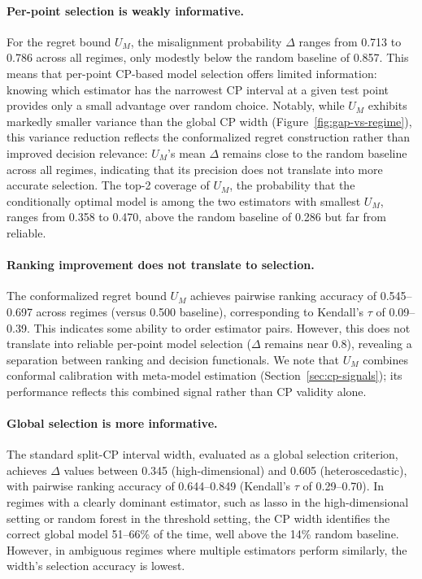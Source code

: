 \documentclass[a4paper,11pt]{article}
\begin{document}
\paragraph{Per-point selection is weakly informative.} For the regret bound $U_M$, the misalignment probability $\Delta$ ranges from 0.713 to 0.786 across all regimes, only modestly below the random baseline of 0.857. This means that per-point CP-based model selection offers limited information: knowing which estimator has the narrowest CP interval at a given test point provides only a small advantage over random choice. Notably, while $U_M$ exhibits markedly smaller variance than the global CP width (Figure~\ref{fig:gap-vs-regime}), this variance reduction reflects the conformalized regret construction rather than improved decision relevance: $U_M$'s mean $\Delta$ remains close to the random baseline across all regimes, indicating that its precision does not translate into more accurate selection. The top-2 coverage of $U_M$, the probability that the conditionally optimal model is among the two estimators with smallest $U_M$, ranges from 0.358 to 0.470, above the random baseline of 0.286 but far from reliable.

\paragraph{Ranking improvement does not translate to selection.}
The conformalized regret bound $U_M$ achieves pairwise ranking accuracy of 0.545--0.697 across regimes (versus 0.500 baseline), corresponding to Kendall's $\tau$ of 0.09--0.39. This indicates some ability to order estimator pairs. However, this does not translate into reliable per-point model selection ($\Delta$ remains near 0.8), revealing a separation between ranking and decision functionals. We note that $U_M$ combines conformal calibration with meta-model estimation (Section~\ref{sec:cp-signals}); its performance reflects this combined signal rather than CP validity alone.

\paragraph{Global selection is more informative.}
The standard split-CP interval width, evaluated as a global selection criterion, achieves $\Delta$ values between 0.345 (high-dimensional) and 0.605 (heteroscedastic), with pairwise ranking accuracy of 0.644--0.849 (Kendall's $\tau$ of 0.29--0.70). In regimes with a clearly dominant estimator, such as lasso in the high-dimensional setting or random forest in the threshold setting, the CP width identifies the correct global model 51--66\% of the time, well above the 14\% random baseline. However, in ambiguous regimes where multiple estimators perform similarly, the width's selection accuracy is lowest.
\end{document}
